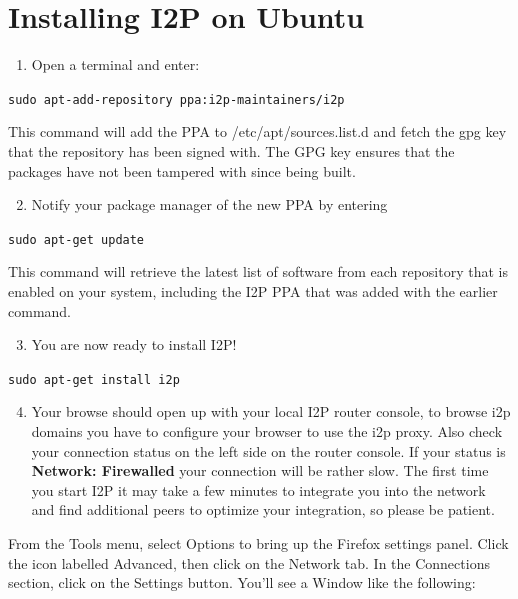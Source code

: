 \section{Installing I2P on Ubuntu}

\begin{enumerate}[1.]
\item
  Open a terminal and enter:
\end{enumerate}
\verb!sudo apt-add-repository ppa:i2p-maintainers/i2p!

This command will add the PPA to /etc/apt/sources.list.d and fetch the
gpg key that the repository has been signed with. The GPG key ensures
that the packages have not been tampered with since being built.

\begin{enumerate}[1.]
\setcounter{enumi}{1}
\item
  Notify your package manager of the new PPA by entering
\end{enumerate}
\verb!sudo apt-get update!

This command will retrieve the latest list of software from each
repository that is enabled on your system, including the I2P PPA that
was added with the earlier command.

\begin{enumerate}[1.]
\setcounter{enumi}{2}
\item
  You are now ready to install I2P!
\end{enumerate}
\verb!sudo apt-get install i2p!

\begin{enumerate}[1.]
\setcounter{enumi}{3}
\item
  Your browse should open up with your local I2P router console, to
  browse i2p domains you have to configure your browser to use the i2p
  proxy. Also check your connection status on the left side on the
  router console. If your status is \textbf{Network: Firewalled} your
  connection will be rather slow. The first time you start I2P it may
  take a few minutes to integrate you into the network and find
  additional peers to optimize your integration, so please be patient.
\end{enumerate}
From the Tools menu, select Options to bring up the Firefox settings
panel. Click the icon labelled Advanced, then click on the Network tab.
In the Connections section, click on the Settings button. You'll see a
Window like the following:

